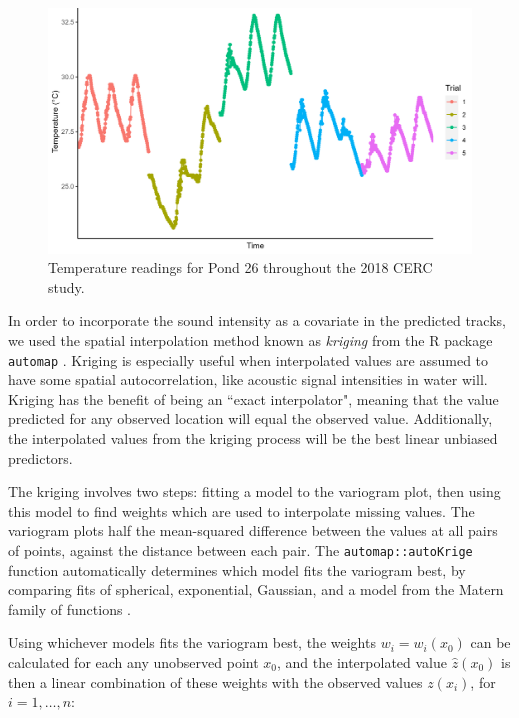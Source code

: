 \documentclass[12pt]{article}
\begin{document}
			\begin{figure}
				\includegraphics[width=\textwidth]{pond_26_temp.png}
				\caption{Temperature readings for Pond 26 throughout the 2018 CERC study.}
				\label{img:temperature}
			\end{figure}
		
			In order to incorporate the sound intensity as a covariate in the predicted tracks, we used the spatial interpolation method known as \emph{kriging} from the R package \texttt{automap} \cite{Hiemstra2008}. Kriging is especially useful when interpolated values are assumed to have some spatial autocorrelation, like acoustic signal intensities in water will. Kriging has the benefit of being an ``exact interpolator", meaning that the value predicted for any observed location will equal the observed value. Additionally, the interpolated values from the kriging process will be the best linear unbiased predictors.
			
			The kriging involves two steps: fitting a model to the variogram plot, then using this model to find weights which are used to interpolate missing values. The variogram plots half the mean-squared difference between the values at all pairs of points, against the distance between each pair. The \texttt{automap::autoKrige} function automatically determines which model fits the variogram best, by comparing fits of spherical, exponential, Gaussian, and a model from the Matern family of functions \cite{Hiemstra2008}. 
			
			Using whichever models fits the variogram best, the weights $w_i = w_i(x_0)$ can be calculated for each any unobserved point $x_0$, and the interpolated value $\hat z(x_0)$ is then a linear combination of these weights with the observed values $z(x_i)$, for $i = 1, \ldots, n$:
			
\end{document}
